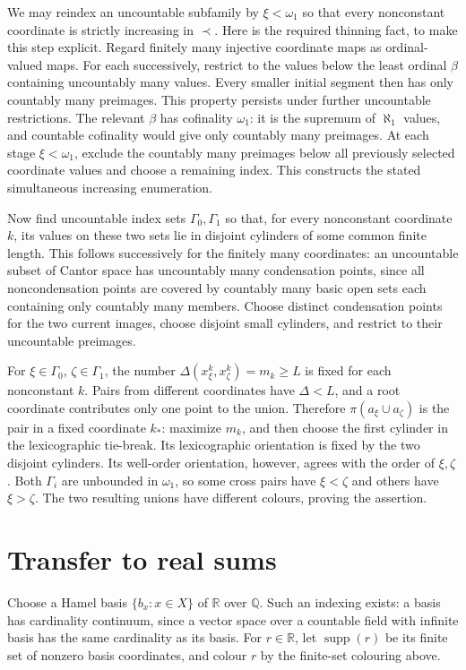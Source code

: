 \documentclass[11pt]{article}
\begin{document}
We may reindex an uncountable subfamily by $\xi<\omega_1$ so that every nonconstant coordinate is strictly increasing in $\prec$. Here is the required thinning fact, to make this step explicit. Regard finitely many injective coordinate maps as ordinal-valued maps. For each successively, restrict to the values below the least ordinal $\beta$ containing uncountably many values. Every smaller initial segment then has only countably many preimages. This property persists under further uncountable restrictions. The relevant $\beta$ has cofinality $\omega_1$: it is the supremum of $\aleph_1$ values, and countable cofinality would give only countably many preimages. At each stage $\xi<\omega_1$, exclude the countably many preimages below all previously selected coordinate values and choose a remaining index. This constructs the stated simultaneous increasing enumeration.

Now find uncountable index sets $\Gamma_0,\Gamma_1$ so that, for every nonconstant coordinate $k$, its values on these two sets lie in disjoint cylinders of some common finite length. This follows successively for the finitely many coordinates: an uncountable subset of Cantor space has uncountably many condensation points, since all noncondensation points are covered by countably many basic open sets each containing only countably many members. Choose distinct condensation points for the two current images, choose disjoint small cylinders, and restrict to their uncountable preimages.

For $\xi\in\Gamma_0$, $\zeta\in\Gamma_1$, the number $\Delta(x^k_\xi,x^k_\zeta)=m_k\ge L$ is fixed for each nonconstant $k$. Pairs from different coordinates have $\Delta<L$, and a root coordinate contributes only one point to the union. Therefore $\pi(a_\xi\cup a_\zeta)$ is the pair in a fixed coordinate $k_*$: maximize $m_k$, and then choose the first cylinder in the lexicographic tie-break. Its lexicographic orientation is fixed by the two disjoint cylinders. Its well-order orientation, however, agrees with the order of $\xi,\zeta$. Both $\Gamma_i$ are unbounded in $\omega_1$, so some cross pairs have $\xi<\zeta$ and others have $\xi>\zeta$. The two resulting unions have different colours, proving the assertion.

\section*{Transfer to real sums}
Choose a Hamel basis $\{b_x:x\in X\}$ of $\mathbb R$ over $\mathbb Q$. Such an indexing exists: a basis has cardinality continuum, since a vector space over a countable field with infinite basis has the same cardinality as its basis. For $r\in\mathbb R$, let $\operatorname{supp}(r)$ be its finite set of nonzero basis coordinates, and colour $r$ by the finite-set colouring above.
\end{document}
